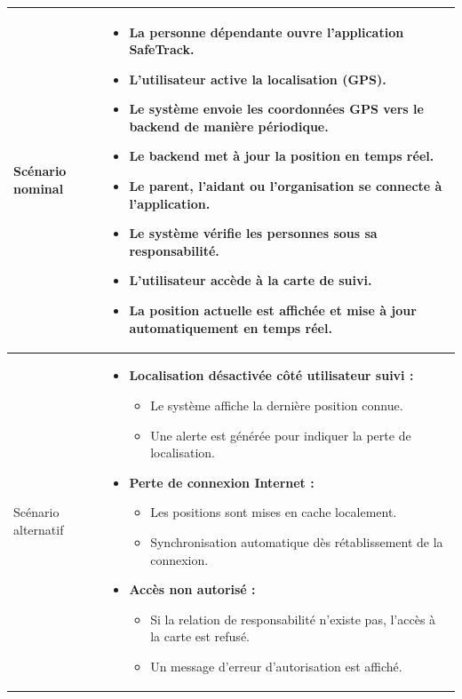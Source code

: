 \begin{longtable}{|p{}|>{\raggedright\arraybackslash}p{}|}
Scénario nominal & 
\begin{itemize}
\item La personne dépendante ouvre l’application SafeTrack.
\item L’utilisateur active la localisation (GPS).
\item Le système envoie les coordonnées GPS vers le backend de manière périodique.
\item Le backend met à jour la position en temps réel.
\item Le parent, l’aidant ou l’organisation se connecte à l’application.
\item Le système vérifie les personnes sous sa responsabilité.
\item L’utilisateur accède à la carte de suivi.
\item La position actuelle est affichée et mise à jour automatiquement en temps réel.
\end{itemize}
\\ \hline

Scénario alternatif & 
\begin{itemize}
\item \textbf{Localisation désactivée côté utilisateur suivi :}
\begin{itemize}
\item Le système affiche la dernière position connue.
\item Une alerte est générée pour indiquer la perte de localisation.
\end{itemize}

\item \textbf{Perte de connexion Internet :}
\begin{itemize}
\item Les positions sont mises en cache localement.
\item Synchronisation automatique dès rétablissement de la connexion.
\end{itemize}

\item \textbf{Accès non autorisé :}
\begin{itemize}
\item Si la relation de responsabilité n’existe pas, l’accès à la carte est refusé.
\item Un message d’erreur d’autorisation est affiché.
\end{itemize}
\end{itemize}
\\ \hline

\end{longtable}
